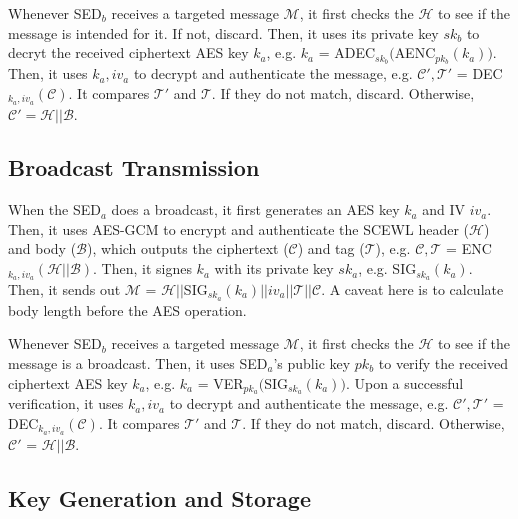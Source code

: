 \documentclass[11pt,oneside,onecolumn,letterpaper]{article}
\begin{document}
Whenever SED$_b$ receives a targeted message $\mathcal{M}$, it first checks the $\mathcal{H}$ to see if the message is intended for it. If not, discard.
Then, it uses its private key $sk_b$ to decryt the received ciphertext AES key $k_a$, e.g. $k_a$ = ADEC$_{sk_b}($AENC$_{pk_b}(k_a))$.
Then, it uses $k_a, iv_a$ to decrypt and authenticate the message, e.g. $\mathcal{C'}, \mathcal{T'}$ = DEC$_{k_a, iv_a}(\mathcal{C})$.
It compares $\mathcal{T'}$ and $\mathcal{T}$.
If they do not match, discard.
Otherwise, $\mathcal{C'}=\mathcal{H}||\mathcal{B}$.


\subsection{Broadcast Transmission}

When the SED$_a$ does a broadcast, it first generates an AES key $k_a$ and IV $iv_a$. 
Then, it uses AES-GCM to encrypt and authenticate the SCEWL header ($\mathcal{H}$) and body ($\mathcal{B}$), which outputs the ciphertext ($\mathcal{C}$) and tag ($\mathcal{T}$), e.g. $\mathcal{C}, \mathcal{T}$ = ENC$_{k_a, iv_a}(\mathcal{H} || \mathcal{B})$.
Then, it signes $k_a$ with its private key $sk_a$, e.g. SIG$_{sk_a}(k_a)$.
Then, it sends out $\mathcal{M}$ = $\mathcal{H} || $SIG$_{sk_a}(k_a)||iv_a||\mathcal{T}||\mathcal{C}$.
A caveat here is to calculate body length before the AES operation.

Whenever SED$_b$ receives a targeted message $\mathcal{M}$, it first checks the $\mathcal{H}$ to see if the message is a broadcast.
Then, it uses SED$_a$'s public key $pk_b$ to verify the received ciphertext AES key $k_a$, e.g. $k_a$ = VER$_{pk_a}($SIG$_{sk_a}(k_a))$.
Upon a successful verification, it uses $k_a, iv_a$ to decrypt and authenticate the message, e.g. $\mathcal{C'}, \mathcal{T'}$ = DEC$_{k_a, iv_a}(\mathcal{C})$.
It compares $\mathcal{T'}$ and $\mathcal{T}$.
If they do not match, discard.
Otherwise, $\mathcal{C'}$ = $\mathcal{H}||\mathcal{B}$.

\subsection{Key Generation and Storage}
\end{document}
